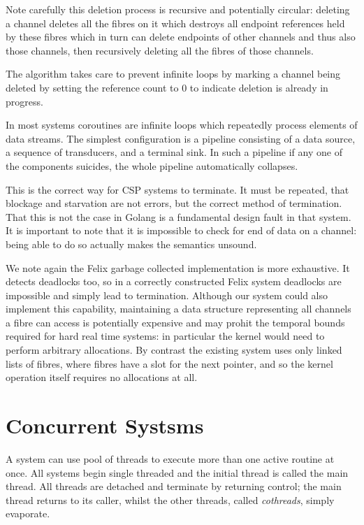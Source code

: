 \documentclass[oneside]{book}
\begin{document}
Note carefully this deletion process is recursive and potentially
circular: deleting a channel deletes all the fibres on it which
destroys all endpoint references held by these fibres which
in turn can delete endpoints of other channels and thus also
those channels, then recursively deleting all the fibres
of those channels.

The algorithm takes care to prevent infinite loops by marking
a channel being deleted by setting the reference count to 0
to indicate deletion is already in progress.

In most systems coroutines are infinite loops which repeatedly
process elements of data streams. The simplest configuration is
a pipeline consisting of a data source, a sequence of transducers,
and a terminal sink. In such a pipeline if any one of the components
suicides, the whole pipeline automatically collapses. 

This is the correct way for CSP systems to terminate. It must be repeated,
that blockage and starvation are not errors, but the correct method of termination.
That this is not the case in Golang is a fundamental design fault in that
system. It is important to note that it is impossible to check for
end of data on a channel: being able to do so actually makes the semantics
unsound.

We note again the Felix garbage collected implementation is more exhaustive.
It detects deadlocks too, so in a correctly constructed Felix system
deadlocks are impossible and simply lead to termination. Although our
system could also implement this capability, maintaining a data structure
representing all channels a fibre can access is potentially expensive
and may prohit the temporal bounds required for hard real time systems:
in particular the kernel would need to perform arbitrary allocations.
By contrast the existing system uses only linked lists of fibres,
where fibres have a slot for the next pointer, and so the kernel operation
itself requires no allocations at all.

\section{Concurrent Systsms}
A system can use pool of threads to execute more than one active
routine at once. All systems begin single threaded and the initial
thread is called the main thread. All threads are detached and terminate
by returning control; the main thread returns to its caller, whilst
the other threads, called {\em cothreads}, simply evaporate.
\end{document}
